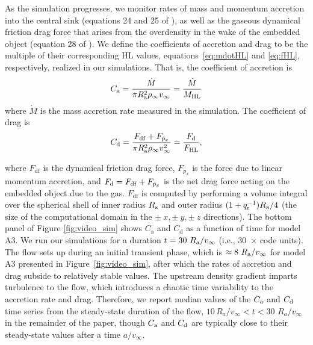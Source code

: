 As the simulation progresses, we monitor rates of mass and momentum accretion into the central sink (equations 24 and 25 of \cite{MacLeod:2017}), as well as the gaseous dynamical friction drag force that arises from the overdensity in the wake of the embedded object (equation 28 of \cite{MacLeod:2017}). 
We define the coefficients of accretion and drag to be the multiple of their corresponding HL %
values, equations~\eqref{eq:mdotHL} and \eqref{eq:fHL}, respectively, realized in our simulations.  That is, the coefficient of accretion is
\begin{equation}\label{eq:C_a}
    C_{\mathrm a} = \frac{\dot M}{\pi R_{\mathrm{a}}^2 \rho_\infty v_\infty} = \frac{\dot M }{ M_{\rm{HL}}}
\end{equation}
where $\dot M$ is the mass accretion rate measured in the simulation. The coefficient of drag is 
\begin{equation}\label{eq:C_d}
    C_{\mathrm d} = \frac{F_{\mathrm{df}} + F_{\dot p_x} }{ \pi R_{\mathrm{a}}^2 \rho_\infty v_\infty^2} = \frac{F_{\rm d} }{ F_{\rm{HL}}},
\end{equation}

where $F_{\mathrm{df}}$ is the dynamical friction drag force, $F_{\dot p_x}$ is the force due to linear momentum accretion, and $F_{\rm d} = F_{\mathrm{df}} + F_{\dot p_x}$ is the net drag force acting on the embedded object due to the gas. $F_{\mathrm{df}}$ is computed by performing a volume integral over the spherical shell of inner radius $R_{\rm s}$ and outer radius $(1 + q_{\rm r}^{-1}) R_{\mathrm{a}}/4$ (the size of the computational domain in the $\pm~x, \pm~y, \pm~z$ directions).
The bottom panel of Figure \ref{fig:video_sim} shows $C_{\mathrm a}$ and $C_{\mathrm d}$ as a function of time for model A3. We run our simulations for a duration $t = 30~R_{\rm a}/v_\infty$ (i.e., 30~$\times$ code units). The flow sets up during an initial transient phase, which is $\approx 8~R_{\rm a}/v_\infty$ for model A3 presented in Figure~\ref{fig:video_sim}, after which the rates of accretion and drag subside to relatively stable values. The upstream density gradient imparts turbulence to the flow, which introduces a chaotic time variability to the accretion rate and drag. Therefore, we report median values of the $C_{\rm a}$ and $C_{\rm d}$ time series from the steady-state duration of the flow, $10 \, R_a / v_\infty < t < 30$ $R_a / v_\infty$ in the remainder of the paper, though $C_{\rm a}$ and $C_{\rm d}$ are typically close to their steady-state values after a time $a/v_\infty$. 

